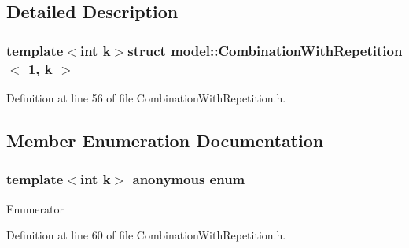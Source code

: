 \subsection{Detailed Description}
\subsubsection*{template$<$int k$>$struct model\+::\+Combination\+With\+Repetition$<$ 1, k $>$}



Definition at line 56 of file Combination\+With\+Repetition.\+h.



\subsection{Member Enumeration Documentation}
\hypertarget{structmodel_1_1_combination_with_repetition_3_011_00_01k_01_4_a1e523a554e6ec5beb4e53259964deeb7}{}\subsubsection[{anonymous enum}]{\setlength{\rightskip}{0pt plus 5cm}template$<$int k$>$ anonymous enum}\label{structmodel_1_1_combination_with_repetition_3_011_00_01k_01_4_a1e523a554e6ec5beb4e53259964deeb7}
\begin{Desc}
\item[Enumerator]\par
\begin{description}
\item[{\em 
\hypertarget{structmodel_1_1_combination_with_repetition_3_011_00_01k_01_4_a1e523a554e6ec5beb4e53259964deeb7a1e2b2b3e3c91c5164961fe1da63592e6}{}N\label{structmodel_1_1_combination_with_repetition_3_011_00_01k_01_4_a1e523a554e6ec5beb4e53259964deeb7a1e2b2b3e3c91c5164961fe1da63592e6}
}]\end{description}
\end{Desc}


Definition at line 60 of file Combination\+With\+Repetition.\+h.

